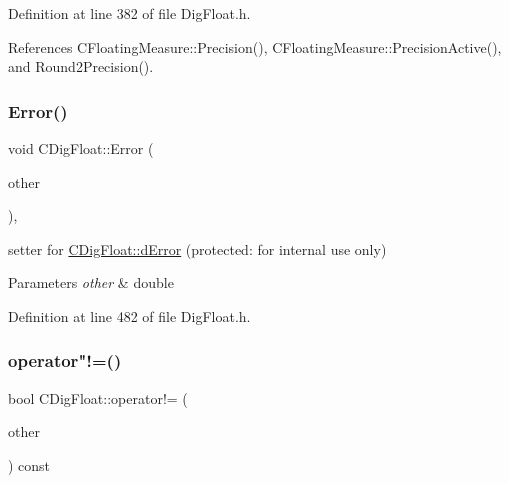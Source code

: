 Definition at line 382 of file Dig\+Float.\+h.



References C\+Floating\+Measure\+::\+Precision(), C\+Floating\+Measure\+::\+Precision\+Active(), and Round2\+Precision().

\mbox{\label{classCDigFloat_a5fdd0d560073f5d06b41c7f66933635e}} 
\subsubsection{\texorpdfstring{Error()}{Error()}\hspace{0.1cm}{\footnotesize\ttfamily [2/2]}}
{\footnotesize\ttfamily void C\+Dig\+Float\+::\+Error (\begin{DoxyParamCaption}\item[{const double}]{other }\end{DoxyParamCaption})\hspace{0.3cm}{\ttfamily [inline]}, {\ttfamily [protected]}}



setter for \hyperlink{classCDigFloat_a25eb3782d1e727ff007a48f8308e3d4d}{C\+Dig\+Float\+::d\+Error} (protected\+: for internal use only) 


\begin{DoxyParams}{Parameters}
{\em other} & double \\
\hline
\end{DoxyParams}


Definition at line 482 of file Dig\+Float.\+h.

\mbox{\label{classCDigFloat_a15c13c035aff8184491bd9629403a33a}} 
\subsubsection{\texorpdfstring{operator"!=()}{operator!=()}}
{\footnotesize\ttfamily bool C\+Dig\+Float\+::operator!= (\begin{DoxyParamCaption}\item[{const \hyperlink{classCDigFloat}{C\+Dig\+Float} \&}]{other }\end{DoxyParamCaption}) const}




